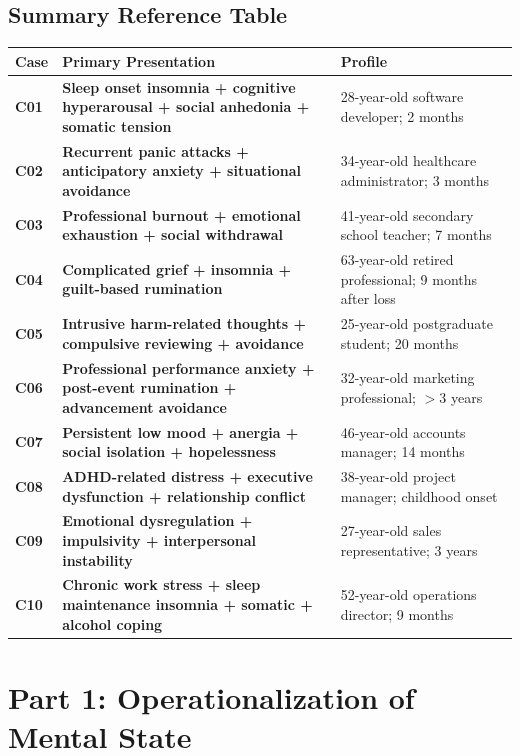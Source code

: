 \documentclass[11pt,a4paper]{article}
\begin{document}
\subsection*{Summary Reference Table}
\small
\begin{tabularx}{\textwidth}{@{}>{\bfseries\color{PrimaryBlue}}p{}>{\bfseries}p{}p{}@{}}
\toprule
\textbf{Case} & \textbf{Primary Presentation} & \textbf{Profile} \\
\midrule
C01 & Sleep onset insomnia + cognitive hyperarousal + social anhedonia + somatic tension & 28-year-old software developer; 2 months \\
C02 & Recurrent panic attacks + anticipatory anxiety + situational avoidance & 34-year-old healthcare administrator; 3 months \\
C03 & Professional burnout + emotional exhaustion + social withdrawal & 41-year-old secondary school teacher; 7 months \\
C04 & Complicated grief + insomnia + guilt-based rumination & 63-year-old retired professional; 9 months after loss \\
C05 & Intrusive harm-related thoughts + compulsive reviewing + avoidance & 25-year-old postgraduate student; 20 months \\
C06 & Professional performance anxiety + post-event rumination + advancement avoidance & 32-year-old marketing professional; $>$3 years \\
C07 & Persistent low mood + anergia + social isolation + hopelessness & 46-year-old accounts manager; 14 months \\
C08 & ADHD-related distress + executive dysfunction + relationship conflict & 38-year-old project manager; childhood onset \\
C09 & Emotional dysregulation + impulsivity + interpersonal instability & 27-year-old sales representative; 3 years \\
C10 & Chronic work stress + sleep maintenance insomnia + somatic + alcohol coping & 52-year-old operations director; 9 months \\
\bottomrule
\end{tabularx}

\newpage

\section{Part 1: Operationalization of Mental State}
\end{document}
